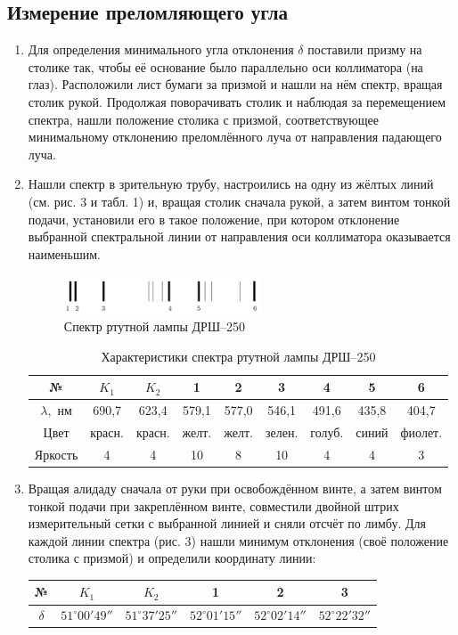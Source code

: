 \documentclass[a4paper, 12pt]{article}%
\begin{document}
	\subsection*{Измерение преломляющего угла}
	\begin{enumerate}
		\item Для определения минимального угла отклонения $\delta$ поставили призму на столике так, чтобы её основание было параллельно оси коллиматора (на глаз). Расположили лист бумаги за призмой и нашли на нём спектр, вращая столик рукой. Продолжая поворачивать столик и наблюдая за перемещением спектра, нашли положение столика с призмой, соответствующее минимальному отклонению преломлённого луча от направления падающего луча.
		
		\item Нашли спектр в зрительную трубу, настроились на одну из жёлтых линий (см. рис. 3 и табл. 1) и, вращая столик сначала рукой, а затем винтом тонкой подачи, установили его в такое положение, при котором отклонение выбранной спектральной линии от направления оси коллиматора оказывается наименьшим.		
		\begin{figure}[h]
			\begin{center}
				\includegraphics[width = 0.55\textwidth]{pic/443-3.png}
				\caption{Спектр ртутной лампы ДРШ--250}
			\end{center}
		\end{figure}
	\begin{table}[]
		\centering
		\begin{tabular}{|c|c|c|c|c|c|c|c|c|}
			\hline
			№ & $K_1$ & $K_2$ & 1 & 2 & 3 & 4 & 5 & 6 \\ \hline
			$\lambda,$ нм & 690,7 & 623,4 & 579,1 & 577,0 & 546,1 & 491,6 & 435,8 & 404,7 \\ \hline
			Цвет &красн.&красн.& желт. & желт. & зелен. & голуб. & синий & фиолет. \\ \hline
			Яркость & 4 & 4&10 & 8 & 10 & 4 & 4 & 3 \\ \hline
		\end{tabular}
		\caption{Характеристики спектра ртутной лампы ДРШ--250}
		\label{tab:my-table}
	\end{table}
	\item Вращая алидаду сначала от руки при освобождённом винте, а затем винтом тонкой подачи при закреплённом винте, совместили двойной штрих измерительный сетки с выбранной линией и сняли отсчёт по лимбу. Для каждой линии спектра (рис. 3) нашли минимум отклонения (своё положение столика с призмой) и определили координату линии:
	\begin{center}
		\centering
		\begin{tabular}{|c|c|c|c|c|c|}
			\hline
			№ & $K_1$ & $K_2$ & 1 & 2 & 3  \\ \hline
			$\delta$ & $51^\circ00'49''$ & $51^\circ37'25''$ & $52^\circ01'15''$ & $52^\circ02'14''$ & $52^\circ22'32''$ \\ \hline
		\end{tabular}
	

\end{center}
\end{enumerate}
\end{document}
